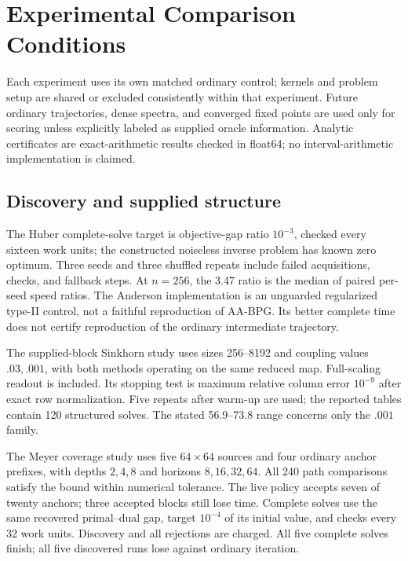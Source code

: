 \documentclass[journal]{IEEEtran}
\theoremstyle{definition}
\begin{document}
\section{Experimental Comparison Conditions}\label{app:protocol}
Each experiment uses its own matched ordinary control; kernels and problem
setup are shared or excluded consistently within that experiment.
Future ordinary trajectories, dense spectra, and converged fixed points
are used only for scoring unless explicitly labeled as supplied oracle
information. Analytic certificates are exact-arithmetic results checked in
float64; no interval-arithmetic implementation is claimed.

\subsection{Discovery and supplied structure}
The Huber complete-solve target is objective-gap ratio $10^{-3}$, checked
every sixteen work units; the constructed noiseless inverse problem has
known zero optimum. Three seeds and three shuffled repeats include failed
acquisitions, checks, and fallback steps. At $n=256$, the 3.47 ratio is the
median of paired per-seed speed ratios. The Anderson implementation is an
unguarded regularized type-II control, not a faithful reproduction of
AA-BPG. Its better complete time does not certify reproduction of the
ordinary intermediate trajectory.

The supplied-block Sinkhorn study uses sizes 256--8192 and coupling values
$.03,.001$, with both methods operating on the same reduced map.
Full-scaling readout is included. Its stopping test is maximum relative
column error $10^{-9}$ after exact row normalization. Five repeats after
warm-up are used; the reported tables contain 120 structured solves.
The stated 56.9--73.8 range concerns only the $.001$ family.

The Meyer coverage study uses five $64\times64$ sources and four ordinary
anchor prefixes, with depths $2,4,8$ and horizons $8,16,32,64$. All 240
path comparisons satisfy the bound within numerical tolerance.
The live policy accepts seven of twenty anchors; three accepted blocks
still lose time. Complete solves use the same recovered primal--dual gap,
target $10^{-4}$ of its initial value, and checks every 32 work units.
Discovery and all rejections are charged. All five complete solves finish;
all five discovered runs lose against ordinary iteration.
\end{document}
